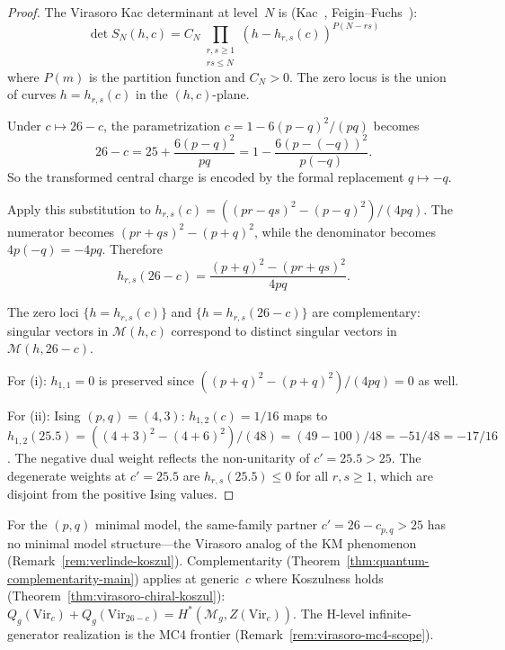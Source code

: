\begin{proof}
The Virasoro Kac determinant at level~$N$ is
(Kac~\cite{Kac}, Feigin--Fuchs~\cite{FF84}):
\[
\det S_N(h, c) = C_N \prod_{\substack{r, s \geq 1 \\ rs \leq N}}
(h - h_{r,s}(c))^{P(N - rs)}
\]
where $P(m)$ is the partition function and $C_N > 0$.  The zero locus
is the union of curves $h = h_{r,s}(c)$ in the $(h, c)$-plane.

Under $c \mapsto 26 - c$, the parametrization
$c = 1 - 6(p-q)^2/(pq)$ becomes
\[
26 - c = 25 + \frac{6(p-q)^2}{pq}
= 1 - \frac{6(p-(-q))^2}{p(-q)}.
\]
So the transformed central charge is encoded by the formal
replacement $q \mapsto -q$.

Apply this substitution to
$h_{r,s}(c) = ((pr-qs)^2 - (p-q)^2)/(4pq)$.
The numerator becomes $(pr+qs)^2 - (p+q)^2$, while the denominator
becomes $4p(-q) = -4pq$.  Therefore
\[
h_{r,s}(26-c) = \frac{(p+q)^2 - (pr+qs)^2}{4pq}.
\]

The zero loci $\{h = h_{r,s}(c)\}$ and $\{h = h_{r,s}(26-c)\}$ are
complementary: singular vectors in $\mathcal{M}(h, c)$ correspond to
distinct singular vectors in $\mathcal{M}(h, 26-c)$.

For (i): $h_{1,1} = 0$ is preserved
since $((p+q)^2 - (p+q)^2)/(4pq) = 0$ as well.

For (ii): Ising $(p,q) = (4,3)$: $h_{1,2}(c) = 1/16$ maps to
$h_{1,2}(25.5) = ((4+3)^2 - (4+6)^2)/(48) = (49 - 100)/48 = -51/48
= -17/16$.  The negative dual weight reflects the non-unitarity of
$c' = 25.5 > 25$.  The degenerate
weights at $c' = 25.5$ are $h_{r,s}(25.5) \leq 0$ for all $r, s \geq 1$,
which are disjoint from the positive Ising values.
\end{proof}

\begin{remark}
\label{rem:virasoro-module-koszul-minimal}
For the $(p,q)$ minimal model, the same-family partner $c' = 26 - c_{p,q} > 25$ has no minimal model structure---the Virasoro analog of the KM phenomenon (Remark~\ref{rem:verlinde-koszul}).  Complementarity (Theorem~\ref{thm:quantum-complementarity-main}) applies at generic~$c$ where Koszulness holds (Theorem~\ref{thm:virasoro-chiral-koszul}): $Q_g(\mathrm{Vir}_c) + Q_g(\mathrm{Vir}_{26-c}) = H^*(\mathcal{M}_g, Z(\mathrm{Vir}_c))$.  The H-level infinite-generator realization is the MC4 frontier (Remark~\ref{rem:virasoro-mc4-scope}).
\end{remark}


